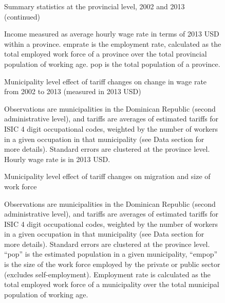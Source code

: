 \documentclass[12pt]{article}
\begin{document}
\begin{figure}[H]
\begin{center}
Summary statistics at the provincial level, 2002 and 2013 (continued)

\caption{\label{fig:Summary 3}}
\end{center}
Income measured
as average hourly wage rate in terms of 2013 USD within a province.
emprate is the employment rate, calculated as the total employed work force of a province
over the total provincial population of working age.
pop is the total population of a province.
\end{figure}

\begin{landscape}
\begin{figure}[H]
\begin{center}
Municipality level effect of tariff changes on change in wage rate from 2002 to 2013 (measured
in 2013 USD)

\caption{\label{fig:Table1}}
\end{center}
Observations are municipalities in the Dominican Republic (second administrative level),
and tariffs are averages of estimated tariffs for ISIC 4 %
digit occupational codes,
weighted by the number of workers in a given occupation in that municipality 
(see Data section for more details). Standard errors are clustered at the province level.
Hourly wage rate is in 2013 USD.
\end{figure}

\begin{figure}[H]
\begin{center}
Municipality level effect of tariff changes on migration and size of work force

\caption{\label{fig:Table3}}
\end{center}
Observations are municipalities in the Dominican Republic (second administrative level),
and tariffs are averages of estimated tariffs for ISIC 4 %
digit occupational codes,
weighted by the number of workers in a given occupation in that municipality 
(see Data section for more details). Standard errors are clustered at the province level.
``pop'' is the estimated population in a given municipality, ``empop'' is the size of
the work force employed by the private or public sector (excludes self-employment).
Employment rate is calculated as the total employed work force of a municipality
over the total municipal population of working age.
\end{figure}


\end{landscape}
\end{document}
